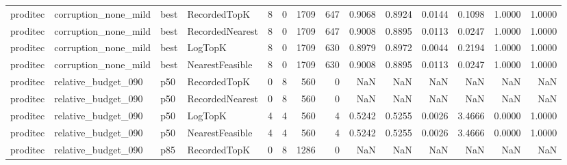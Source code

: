 \begin{tabular}{llllrrrrrrrrrr}
proditec & corruption\_none\_mild &   best &    RecordedTopK &           8 &          0 &           1709 &                 647 &         0.9068 &          0.8924 &                    0.0144 &         0.1098 &                 1.0000 &                  1.0000 \\
proditec & corruption\_none\_mild &   best & RecordedNearest &           8 &          0 &           1709 &                 647 &         0.9008 &          0.8895 &                    0.0113 &         0.0247 &                 1.0000 &                  1.0000 \\
proditec & corruption\_none\_mild &   best &         LogTopK &           8 &          0 &           1709 &                 630 &         0.8979 &          0.8972 &                    0.0044 &         0.2194 &                 1.0000 &                  1.0000 \\
proditec & corruption\_none\_mild &   best & NearestFeasible &           8 &          0 &           1709 &                 630 &         0.9008 &          0.8895 &                    0.0113 &         0.0247 &                 1.0000 &                  1.0000 \\
proditec &  relative\_budget\_090 &    p50 &    RecordedTopK &           0 &          8 &            560 &                   0 &            NaN &             NaN &                       NaN &            NaN &                    NaN &                     NaN \\
proditec &  relative\_budget\_090 &    p50 & RecordedNearest &           0 &          8 &            560 &                   0 &            NaN &             NaN &                       NaN &            NaN &                    NaN &                     NaN \\
proditec &  relative\_budget\_090 &    p50 &         LogTopK &           4 &          4 &            560 &                   4 &         0.5242 &          0.5255 &                    0.0026 &         3.4666 &                 0.0000 &                  1.0000 \\
proditec &  relative\_budget\_090 &    p50 & NearestFeasible &           4 &          4 &            560 &                   4 &         0.5242 &          0.5255 &                    0.0026 &         3.4666 &                 0.0000 &                  1.0000 \\
proditec &  relative\_budget\_090 &    p85 &    RecordedTopK &           0 &          8 &           1286 &                   0 &            NaN &             NaN &                       NaN &            NaN &                    NaN &                     NaN \\

\end{tabular}
